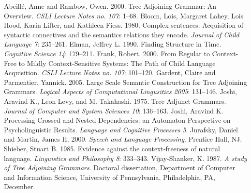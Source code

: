 \documentclass[12pt]{article}
\begin{document}
\singlespace
\begin{thebibliography}{4in}
 Abeill\'e, Anne and Rambow, Owen.  2000.  Tree
Adjoining Grammar: An Overview.  \textit{CSLI Lecture Notes no. 107}:
1--68.
 Bloom, Lois, Margaret Lahey, Lois Hood, Karin
Lifter, and Kathleen Fiess.  1980.  Complex sentences: Acquisition of
syntactic connectives and the semantics relations they encode.
\textit{Journal of Child Language 7}: 235--261.
 Elman, Jeffrey L.  1990.  Finding Structure in
Time.  \textit{Cognitive Science 14}: 179--211.
 Frank, Robert.  2000.  From Regular to Context-Free
to Mildly Context-Sensitive Systems: The Path of Child Language
Acquisition.  \textit{CSLI Lecture Notes no. 107}: 101--120.
 Gardent, Claire and Parmentier, Yannick.  2005.
Large Scale Semantic Construction for Tree Adjoining Grammars.
\textit{Logical Aspects of Computational Lingusitics 2005}: 131--146.
 Joshi, Aravind K., Leon Levy, and M. Takahashi.
1975. Tree Adjunct Grammars. \textit{Journal of Computer and System
Sciences 10}: 136--163.
 Joshi, Aravind K.  Processing Crossed and Nested
Dependencies: an Automaton Perspective on Psycholinguistic Results.
\textit{Language and Cognitive Processes 5}.
 Jurafsky, Daniel and Martin, James H. 2000.
\textit{Speech and Language Processing}.  Prentice Hall, NJ.
 Shieber, Stuart B.  1985. Evidence against the
context-freeness of natural language.  \textit{Linguistics and
Philosophy 8}: 333--343.
 Vijay-Shanker, K. 1987.  \textit{A study of
Tree Adjoining Grammars}.  Doctoral dissertation, Department of Computer
and Information Science, University of Pennsylvania, Philadelphia, PA,
December.
\end{thebibliography}
\end{document}

